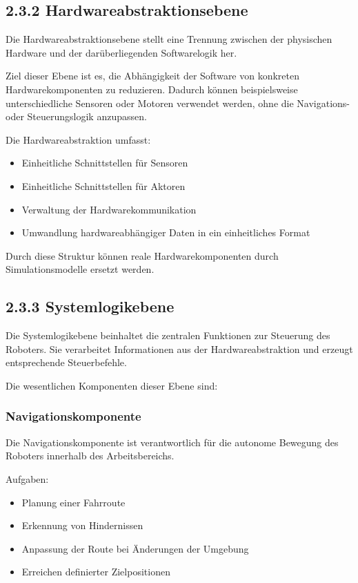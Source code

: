\documentclass[
  a4paper,
  12pt,
  DIV=12,        %
  parskip=half,  %
  headings=small %
]{scrartcl}
\theoremstyle{definition}
\providecommand{\tightlist}{%
  \setlength{\itemsep}{0pt}\setlength{\parskip}{0pt}}
\theoremstyle{definition}
\providecommand{\tightlist}{%
  \setlength{\itemsep}{0pt}\setlength{\parskip}{0pt}}
\begin{document}
\subsection{2.3.2
Hardwareabstraktionsebene}\label{hardwareabstraktionsebene}

Die Hardwareabstraktionsebene stellt eine Trennung zwischen der
physischen Hardware und der darüberliegenden Softwarelogik her.

Ziel dieser Ebene ist es, die Abhängigkeit der Software von konkreten
Hardwarekomponenten zu reduzieren. Dadurch können beispielsweise
unterschiedliche Sensoren oder Motoren verwendet werden, ohne die
Navigations- oder Steuerungslogik anzupassen.

Die Hardwareabstraktion umfasst:

\begin{itemize}
\tightlist
\item
  Einheitliche Schnittstellen für Sensoren
\item
  Einheitliche Schnittstellen für Aktoren
\item
  Verwaltung der Hardwarekommunikation
\item
  Umwandlung hardwareabhängiger Daten in ein einheitliches Format
\end{itemize}

Durch diese Struktur können reale Hardwarekomponenten durch
Simulationsmodelle ersetzt werden.

\subsection{2.3.3 Systemlogikebene}\label{systemlogikebene}

Die Systemlogikebene beinhaltet die zentralen Funktionen zur Steuerung
des Roboters. Sie verarbeitet Informationen aus der Hardwareabstraktion
und erzeugt entsprechende Steuerbefehle.

Die wesentlichen Komponenten dieser Ebene sind:

\subsubsection{Navigationskomponente}\label{navigationskomponente}

Die Navigationskomponente ist verantwortlich für die autonome Bewegung
des Roboters innerhalb des Arbeitsbereichs.

Aufgaben:

\begin{itemize}
\tightlist
\item
  Planung einer Fahrroute
\item
  Erkennung von Hindernissen
\item
  Anpassung der Route bei Änderungen der Umgebung
\item
  Erreichen definierter Zielpositionen
\end{itemize}
\end{document}
